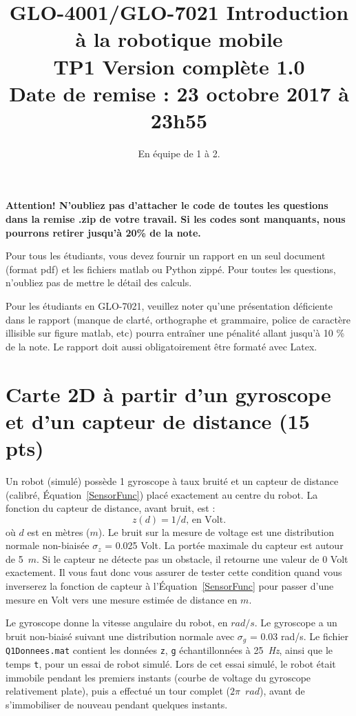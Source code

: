 \documentclass[12pt]{article}
\begin{document}
\title{GLO-4001/GLO-7021 Introduction à la robotique mobile \\  TP1 Version complète 1.0 \\ Date de remise : 23 octobre 2017 à 23h55}
\author{En équipe de 1 à 2.}
\maketitle


{\bf Attention! N'oubliez pas d'attacher le code de toutes les questions dans la remise .zip de votre travail. Si les codes sont manquants, nous pourrons retirer jusqu'à 20\% de la note. }

Pour tous les étudiants, vous devez fournir un rapport en un seul document (format pdf) et les fichiers matlab ou Python zippé. Pour toutes les questions, n'oubliez pas de mettre le détail des calculs.

Pour les étudiants en GLO-7021, veuillez noter qu'une présentation déficiente dans le rapport (manque de clarté, orthographe et grammaire, police de caractère illisible sur figure matlab, etc) pourra entraîner une pénalité allant jusqu'à 10 \% de la note. Le rapport doit aussi obligatoirement être formaté avec Latex.


\section{Carte 2D à partir d'un gyroscope et d'un capteur de distance (15 pts)}

Un robot (simulé) possède 1 gyroscope à taux bruité et un capteur de distance (calibré, Équation~\ref{SensorFunc}) placé exactement au centre du robot. La fonction du capteur de distance, avant bruit, est :
\begin{equation}
z(d) = 1/d  \mbox {, en Volt}.
\label{SensorFunc}
\end{equation}
où $d$ est en mètres ($m$). Le bruit sur la mesure de voltage est une distribution normale non-biaisée $\sigma_z$ = 0.025 Volt. La portée maximale du capteur est autour de 5~$m$. Si le capteur ne détecte pas un obstacle, il retourne une valeur de 0 Volt exactement. Il vous faut donc vous assurer de tester cette condition quand vous inverserez la fonction de capteur à l'Équation~\ref{SensorFunc} pour passer d'une mesure en Volt vers une mesure estimée de distance en $m$. 

Le gyroscope donne la vitesse angulaire du robot, en $rad/s$. Le gyroscope a un bruit non-biaisé suivant une distribution normale avec $\sigma_g$ = 0.03 rad/s. Le fichier \texttt{Q1Donnees.mat} contient les données \texttt{z}, \texttt{g} échantillonnées à 25~\emph{Hz}, ainsi que le temps \texttt{t}, pour un essai de robot simulé. Lors de cet essai simulé, le robot était immobile pendant les premiers instants (courbe de voltage du gyroscope relativement plate), puis a effectué un tour complet ($2\pi$~$rad$), avant de s'immobiliser de nouveau pendant quelques instants.
\end{document}
